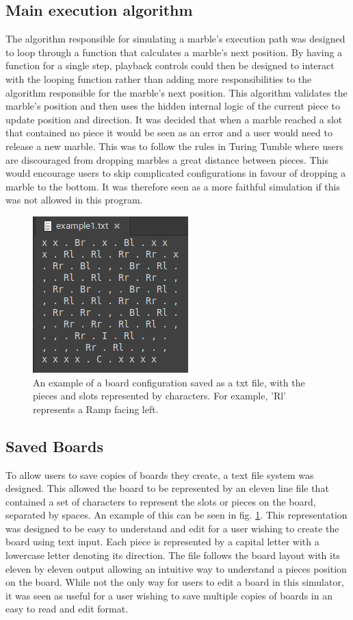 \documentclass{l4proj}
\begin{document}
\subsection{Main execution algorithm}
The algorithm responsible for simulating a marble's execution path was designed to loop through a function that calculates a marble's next position. By having a function for a single step, playback controls could then be designed to interact with the looping function rather than adding more responsibilities to the algorithm responsible for the marble's next position. This algorithm validates the marble's position and then uses the hidden internal logic of the current piece to update position and direction. It was decided that when a marble reached a slot that contained no piece it would be seen as an error and a user would need to release a new marble. This was to follow the rules in Turing Tumble where users are discouraged from dropping marbles a great distance between pieces. This would encourage users to skip complicated configurations in favour of dropping a marble to the bottom. It was therefore seen as a more faithful simulation if this was not allowed in this program. 

\begin{figure}
    \centering
    \includegraphics[width=0.5\linewidth]{images/savedBoard.png}
    \caption{An example of a board configuration saved as a txt file, with the pieces and slots represented by characters. For example, 'Rl' represents a Ramp facing left.}
    \label{fig:savedBoard}
\end{figure}

\subsection{Saved Boards}
To allow users to save copies of boards they create, a text file system was designed. This allowed the board to be represented by an eleven line file that contained a set of characters to represent the slots or pieces on the board, separated by spaces. An example of this can be seen in fig. \ref{fig:savedBoard}. This representation was designed to be easy to understand and edit for a user wishing to create the board using text input. Each piece is represented by a capital letter with a lowercase letter denoting its direction. The file follows the board layout with its eleven by eleven output allowing an intuitive way to understand a pieces position on the board. While not the only way for users to edit a board in this simulator, it was seen as useful for a user wishing to save multiple copies of boards in an easy to read and edit format.
\end{document}
